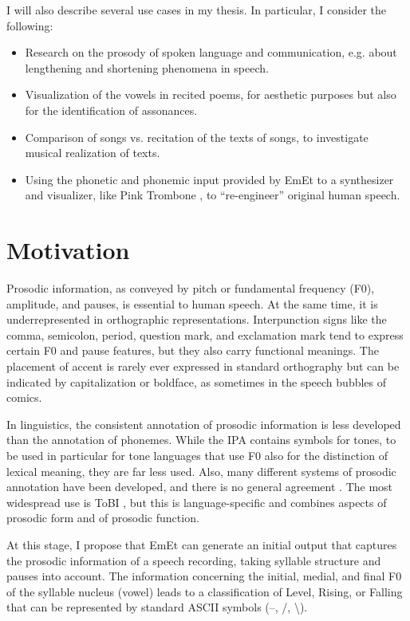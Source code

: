 I will also describe several use cases in my thesis. In particular, I consider the following:

\begin{itemize}
\item Research on the prosody of spoken language and communication, e.g. about lengthening and shortening phenomena in speech.
\item Visualization of the vowels in recited poems, for aesthetic purposes but also for the identification of assonances.
\item Comparison of songs vs. recitation of the texts of songs, to investigate musical realization of texts.
\item Using the phonetic and phonemic input provided by EmEt to a synthesizer and visualizer, like Pink Trombone \cite{rosa2017pinktrombone}, to “re-engineer” original human speech.
\end{itemize}

\section{Motivation}

Prosodic information, as conveyed by pitch or fundamental frequency (F0), amplitude, and pauses, is essential to human speech. At the same time, it is underrepresented in orthographic representations. Interpunction signs like the comma, semicolon, period, question mark, and exclamation mark tend to express certain F0 and pause features, but they also carry functional meanings. The placement of accent is rarely ever expressed in standard orthography but can be indicated by capitalization or boldface, as sometimes in the speech bubbles of comics.

In linguistics, the consistent annotation of prosodic information is less developed than the annotation of phonemes. While the IPA contains symbols for tones, to be used in particular for tone languages that use F0 also for the distinction of lexical meaning, they are far less used. Also, many different systems of prosodic annotation have been developed, and there is no general agreement \cite{gussenhoven2021oxford}. The most widespread use is ToBI \cite{beckman2006tobi}, but this is language-specific and combines aspects of prosodic form and of prosodic function.

At this stage, I propose that EmEt can generate an initial output that captures the prosodic information of a speech recording, taking syllable structure and pauses into account. The information concerning the initial, medial, and final F0 of the syllable nucleus (vowel) leads to a classification of Level, Rising, or Falling that can be represented by standard ASCII symbols (–, /, \textbackslash).

